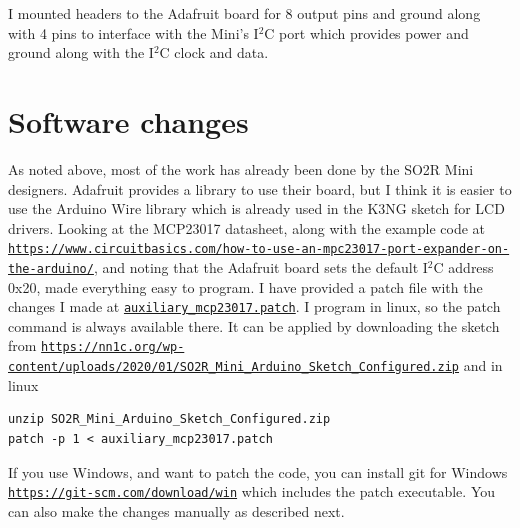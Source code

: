 \documentclass[12pt]{article}
\begin{document}
I mounted headers to the Adafruit board for 8 output pins and ground along
with 4 pins to interface with the Mini's I$^2$C port which provides
power and ground along with the I$^2$C clock and data.

\section{Software changes}
As noted above, most of the work has already been done by the SO2R Mini
designers. Adafruit provides a library to use their board, but I think
it is easier to use the Arduino Wire library which is already used in
the K3NG sketch for LCD drivers. Looking at the MCP23017 datasheet,
along with the example code at 
\href{https://www.circuitbasics.com/how-to-use-an-mpc23017-port-expander-on-the-arduino/}
{\nolinkurl{https://www.circuitbasics.com/how-to-use-an-mpc23017-port-expander-on-the-arduino/}},
and noting that the Adafruit board sets the default I$^2$C address
0x20, made everything easy to program. I have provided a patch file with
the changes I made at
\href{file://w9cf.github.io/articles/so2rmini/auxiliary_mcp23017.patch}
{\nolinkurl{auxiliary_mcp23017.patch}}.
I program in linux, so the patch command is always
available there. It can be applied by downloading the sketch from
\href{https://nn1c.org/wp-content/uploads/2020/01/SO2R_Mini_Arduino_Sketch_Configured.zip}
{\nolinkurl{https://nn1c.org/wp-content/uploads/2020/01/SO2R_Mini_Arduino_Sketch_Configured.zip}}
and in linux
\begin{verbatim}
unzip SO2R_Mini_Arduino_Sketch_Configured.zip
patch -p 1 < auxiliary_mcp23017.patch
\end{verbatim}

If you use Windows, and want to patch the code, you can install
git for Windows
\href{https://git-scm.com/download/win}
{\nolinkurl{https://git-scm.com/download/win}}
which includes the
patch executable. You can also make the changes manually as described next.
\end{document}
